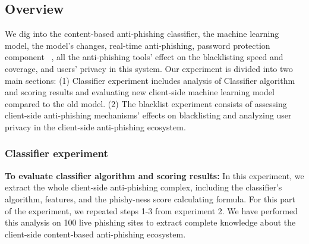 \subsection{Overview}
We dig into the content-based anti-phishing classifier, the machine learning model, the model's changes, real-time anti-phishing, password protection component ~\cite{google-online-security-blog-2019}, all the anti-phishing tools' effect on the blacklisting speed and coverage, and users' privacy in this system.
Our experiment is divided into two main sections:
(1) Classifier experiment includes analysis of Classifier algorithm and scoring results and evaluating new client-side machine learning model compared to the old model. (2) The blacklist experiment consists of assessing client-side anti-phishing mechanisms' effects on blacklisting and analyzing user privacy in the client-side anti-phishing ecosystem.
\subsubsection{Classifier experiment}
\textbf{To evaluate classifier algorithm and scoring results:}
In this experiment, we extract the whole client-side anti-phishing complex, including the classifier's algorithm, features, and the phishy-ness score calculating formula. For this part of the experiment, we repeated steps 1-3 from experiment 2.
We have performed this analysis on 100 live phishing sites to extract complete knowledge about the client-side content-based anti-phishing ecosystem. 

